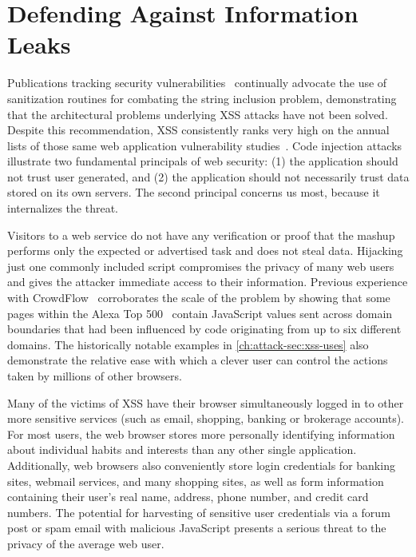 \chapter{Defending Against Information Leaks}\label{ch:defense}

\begin{comment}
on using information flow techniques which can detect and prevent malicious behavior of executing programs.

- change language semantics
- augment memory model with labels
- detect and intercept xss
- prevent information leakage

Combine earlier approaches into a universal and comprehensive framework
- decentralized labeling
- support more flexible policies
- hybrid static/dynamic analysis
- dynamically track information flow
- pervasively works at the lowest layer
\end{comment}

Publications tracking security vulnerabilities~\cite{owasp, cwe, whitehat} continually advocate the use of sanitization routines for combating the string inclusion problem, demonstrating that the architectural problems underlying XSS attacks have not been solved.
Despite this recommendation, XSS consistently ranks very high on the annual lists of those same web application vulnerability studies~\cite{owasp, cwe, whitehat}.
Code injection attacks illustrate two fundamental principals of web security: (1) the application should not trust user generated, and (2) the application should not necessarily trust data stored on its own servers.
The second principal concerns us most, because it internalizes the threat.

Visitors to a web service do not have any verification or proof that the mashup performs only the expected or advertised task and does not steal data.
Hijacking just one commonly included script compromises the privacy of many web users~\cite{nikiforakis.etal+12} and gives the attacker immediate access to their information.
Previous experience with CrowdFlow~\cite{kerschbaumer.etal+13} corroborates the scale of the problem by showing that some pages within the Alexa Top 500~\cite{alexa} contain JavaScript values sent across domain boundaries that had been influenced by code originating from up to six different domains.
The historically notable examples in \autoref{ch:attack-sec:xss-uses} also demonstrate the relative ease with which a clever user can control the actions taken by millions of other browsers.

Many of the victims of XSS have their browser simultaneously logged in to other more sensitive services (such as email, shopping, banking or brokerage accounts).
For most users, the web browser stores more personally identifying information about individual habits and interests than any other single application.
Additionally, web browsers also conveniently store login credentials for banking sites, webmail services, and many shopping sites, as well as form information containing their user's real name, address, phone number, and credit card numbers.
The potential for harvesting of sensitive user credentials via a forum post or spam email with malicious JavaScript presents a serious threat to the privacy of the average web user.

